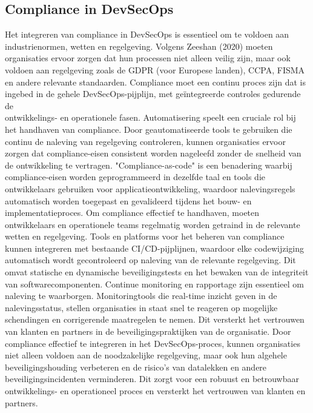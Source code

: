 \documentclass{hogent-article}
\begin{document}
   \subsection{Compliance in DevSecOps}
   
   Het integreren van compliance in DevSecOps is essentieel om te voldoen aan industrienormen, wetten en regelgeving. Volgens Zeeshan (2020) moeten organisaties ervoor zorgen dat hun processen niet alleen veilig zijn, maar ook voldoen aan regelgeving zoals de GDPR (voor Europese landen), CCPA, FISMA en andere relevante standaarden. Compliance moet een continu proces zijn dat is ingebed in de gehele DevSecOps-pijplijn, met geïntegreerde controles gedurende de\\ontwikkelings- en operationele fasen.
   Automatisering speelt een cruciale rol bij het handhaven van compliance. Door geautomatiseerde tools te gebruiken die continu de naleving van regelgeving controleren, kunnen organisaties ervoor zorgen dat compliance-eisen consistent worden nageleefd zonder de snelheid van de ontwikkeling te vertragen. "Compliance-as-code" is een benadering waarbij compliance-eisen worden geprogrammeerd in dezelfde taal en tools die ontwikkelaars gebruiken voor applicatieontwikkeling, waardoor nalevingsregels automatisch worden toegepast en gevalideerd tijdens het bouw- en implementatieproces.
   Om compliance effectief te handhaven, moeten ontwikkelaars en operationele teams regelmatig worden getraind in de relevante wetten en regelgeving. Tools en platforms voor het beheren van compliance kunnen integreren met bestaande CI/CD-pijplijnen, waardoor elke codewijziging automatisch wordt gecontroleerd op naleving van de relevante regelgeving. Dit omvat statische en dynamische beveiligingstests en het bewaken van de integriteit van softwarecomponenten.
   Continue monitoring en rapportage zijn essentieel om naleving te waarborgen. Monitoringtools die real-time inzicht geven in de nalevingsstatus, stellen organisaties in staat snel te reageren op mogelijke schendingen en corrigerende maatregelen te nemen. Dit versterkt het vertrouwen van klanten en partners in de beveiligingspraktijken van de organisatie.
   Door compliance effectief te integreren in het DevSecOps-proces, kunnen organisaties niet alleen voldoen aan de noodzakelijke regelgeving, maar ook hun algehele beveiligingshouding verbeteren en de risico's van datalekken en andere beveiligingsincidenten verminderen. Dit zorgt voor een robuust en betrouwbaar ontwikkelings- en operationeel proces en versterkt het vertrouwen van klanten en partners.\autocite{Zeeshan2020}
   
\end{document}

